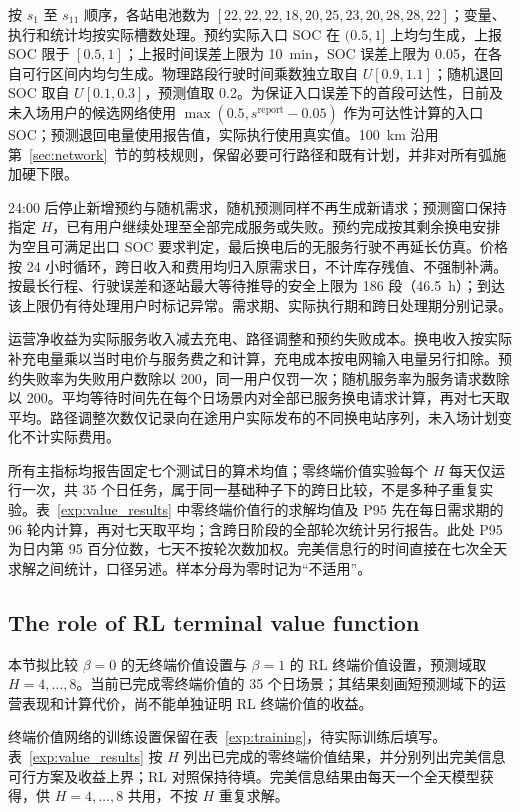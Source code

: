 按 $s_1$ 至 $s_{11}$ 顺序，各站电池数为 $[22,22,22,18,20,25,23,20,28,28,22]$；变量、执行和统计均按实际槽数处理。预约实际入口 SOC 在 $(0.5,1]$ 上均匀生成，上报 SOC 限于 $[0.5,1]$；上报时间误差上限为 10~min，SOC 误差上限为 0.05，在各自可行区间内均匀生成。物理路段行驶时间乘数独立取自 $U[0.9,1.1]$；随机退回 SOC 取自 $U[0.1,0.3]$，预测值取 0.2。为保证入口误差下的首段可达性，日前及未入场用户的候选网络使用 $\max(0.5,s^{\mathrm{report}}-0.05)$ 作为可达性计算的入口 SOC；预测退回电量使用报告值，实际执行使用真实值。100~km 沿用第~\ref{sec:network}~节的剪枝规则，保留必要可行路径和既有计划，并非对所有弧施加硬下限。

24:00 后停止新增预约与随机需求，随机预测同样不再生成新请求；预测窗口保持指定 $H$，已有用户继续处理至全部完成服务或失败。预约完成按其剩余换电安排为空且可满足出口 SOC 要求判定，最后换电后的无服务行驶不再延长仿真。价格按 24 小时循环，跨日收入和费用均归入原需求日，不计库存残值、不强制补满。按最长行程、行驶误差和逐站最大等待推导的安全上限为 186 段（46.5~h）；到达该上限仍有待处理用户时标记异常。需求期、实际执行期和跨日处理期分别记录。

运营净收益为实际服务收入减去充电、路径调整和预约失败成本。换电收入按实际补充电量乘以当时电价与服务费之和计算，充电成本按电网输入电量另行扣除。预约失败率为失败用户数除以 200，同一用户仅罚一次；随机服务率为服务请求数除以 200。平均等待时间先在每个日场景内对全部已服务换电请求计算，再对七天取平均。路径调整次数仅记录向在途用户实际发布的不同换电站序列，未入场计划变化不计实际费用。

所有主指标均报告固定七个测试日的算术均值；零终端价值实验每个 $H$ 每天仅运行一次，共 35 个日任务，属于同一基础种子下的跨日比较，不是多种子重复实验。表~\ref{exp:value_results} 中零终端价值行的求解均值及 P95 先在每日需求期的 96 轮内计算，再对七天取平均；含跨日阶段的全部轮次统计另行报告。此处 P95 为日内第 95 百分位数，七天不按轮次数加权。完美信息行的时间直接在七次全天求解之间统计，口径另述。样本分母为零时记为“不适用”。



\FloatBarrier
\subsection{The role of RL terminal value function}
\label{exp:terminal}

本节拟比较 $\beta=0$ 的无终端价值设置与 $\beta=1$ 的 RL 终端价值设置，预测域取 $H=4,\ldots,8$。当前已完成零终端价值的 35 个日场景；其结果刻画短预测域下的运营表现和计算代价，尚不能单独证明 RL 终端价值的收益。

终端价值网络的训练设置保留在表~\ref{exp:training}，待实际训练后填写。表~\ref{exp:value_results} 按 $H$ 列出已完成的零终端价值结果，并分别列出完美信息可行方案及收益上界；RL 对照保持待填。完美信息结果由每天一个全天模型获得，供 $H=4,\ldots,8$ 共用，不按 $H$ 重复求解。

